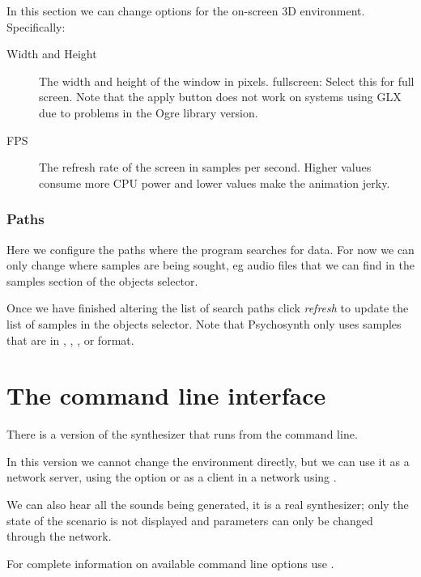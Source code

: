 In this section we can change options for the on-screen 3D
environment. Specifically:

\begin{description}
\item[Width and Height] The width and height of the window in
  pixels. fullscreen: Select this for full screen. Note that the apply
  button does not work on systems using GLX due to problems in the
  Ogre library version.

\item[FPS] The refresh rate of the screen in samples per
  second. Higher values consume more CPU power and lower values make
  the animation jerky.
\end{description}

\subsubsection{Paths}

Here we configure the paths where the program searches for data. For
now we can only change where samples are being sought, eg audio files
that we can find in the samples section of the objects selector.

Once we have finished altering the list of search paths click
\emph{refresh} to update the list of samples in the objects
selector. Note that Psychosynth only uses samples that are in
, , ,  or 
format.

\section{The command line interface}

There is a version of the synthesizer that runs from the command line.

In this version we cannot change the environment directly, but we can
use it as a network server, using the option  or as a
client in a network using .

We can also hear all the sounds being generated, it is a real
synthesizer; only the state of the scenario is not displayed and
parameters can only be changed through the network.

For complete information on available command line options use
.

